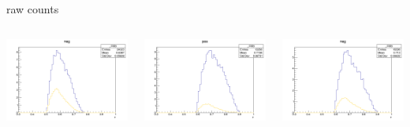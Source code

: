 \begin{frame}{raw counts}
\begin{columns}
\begin{column}[T]{0.25\textwidth}
\includegraphics[width = \textwidth]{results/yield/statistics/yield_x_Q2_z_0.45_4.750_0.60_neg.png}
\end{column}
\begin{column}[T]{0.25\textwidth}
\includegraphics[width = \textwidth]{results/yield/statistics/yield_x_Q2_z_0.45_4.750_0.70_pos.png}
\end{column}
\begin{column}[T]{0.25\textwidth}
\includegraphics[width = \textwidth]{results/yield/statistics/yield_x_Q2_z_0.45_4.750_0.70_neg.png}
\end{column}
\end{columns}
\end{frame}

